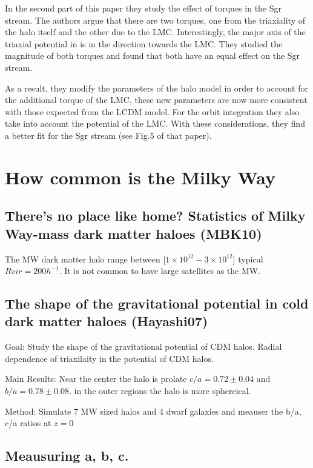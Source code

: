 In the second part of this paper they study the effect of torques in the Sgr
stream. The authors argue that there are two torques, one from the triaxiality
of the halo itself and the other due to the LMC. Interestingly, the major
axis of the triaxial potential in \citep{Law10} is in the direction towards
 the LMC. They studied the magnitude of both torques and found that both
have an equal effect on the Sgr stream.

As a result, they modify the parameters of the halo model in order to account
for the additional torque of the LMC, these new parameters are now more consistent
 with those expected from the LCDM model. For the orbit integration they also take
into account the potential of the LMC. With these considerations, they find a better fit for  the Sgr
stream (see Fig.5 of that paper).

\section{How common is the Milky Way}

\subsection{There’s no place like home? Statistics of Milky Way-mass dark matter
haloes (MBK10)}

The MW dark matter halo range between [$1\times 10^{12} - 3\times 10^{12}$]
typical $Rvir = 200 h^{-1}$. It is not common to have large satellites as
the MW. 

\subsection{The shape of the gravitational potential in cold dark matter haloes (Hayashi07)}

Goal: Study the shape of the gravitational potential of CDM halos. Radial dependence of triaxilaity in the potential of CDM halos.
 
Main Results: Near the center the halo is prolate $c/a = 0.72 \pm 0.04$
and $b/a = 0.78 \pm 0.08$. in the outer regions the halo is more sphereical.

Method: Simulate 7 MW sized halos and 4 dwarf galaxies and meauser the b/a, c/a ratios at $z=0$
\subsection{Meausuring a, b, c.}

